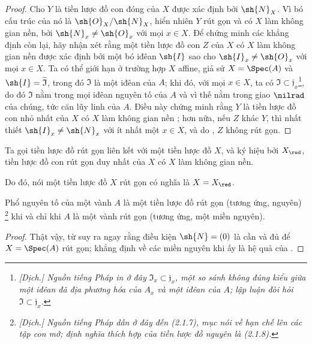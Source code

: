 \documentclass[oneside]{amsart}
\let\EGAOriginalLabel\label
\renewcommand{\label}[1]{\phantomsection\EGAOriginalLabel{#1}}
\begin{document}
\begin{proof}
Cho $Y$ là tiền lược đồ con đóng của $X$ được xác định bởi $\sh{N}_X$.
Vì bó cấu trúc của nó là $\sh{O}_X/\sh{N}_X$, hiển nhiên $Y$ rút gọn và có $X$ làm không gian nền, bởi $\sh{N}_x\neq\sh{O}_x$ với mọi $x\in X$.
Để chứng minh các khẳng định còn lại, hãy nhận xét rằng một tiền lược đồ con $Z$ của $X$ có $X$ làm không gian nền được xác định bởi một bó iđêan $\sh{I}$  sao cho $\sh{I}_x\neq\sh{O}_x$ với mọi $x\in X$.
Ta có thể giới hạn ở trường hợp $X$ affine, giả sử $X=\Spec(A)$ và $\sh{I}=\widetilde{\mathfrak{I}}$, trong đó $\mathfrak{I}$ là một iđêan của $A$;
khi đó, với mọi $x\in X$, ta có $\mathfrak{I}\subset\mathfrak{j}_x$\footnote{\emph{[Dịch.] Nguồn tiếng Pháp in ở đây $\mathfrak{I}_x\subset\mathfrak{j}_x$, một so sánh không đúng kiểu giữa một iđêan đã địa phương hóa của $A_x$ và một iđêan của $A$; lập luận đòi hỏi $\mathfrak{I}\subset\mathfrak{j}_x$.}}, do đó $\mathfrak{I}$ nằm trong mọi iđêan nguyên tố của $A$ và vì thế nằm trong giao $\nilrad$ của chúng, tức căn lũy linh của $A$.
Điều này chứng minh rằng $Y$ là tiền lược đồ con nhỏ nhất của $X$ có $X$ làm không gian nền ;
hơn nữa, nếu $Z$ khác $Y$, thì nhất thiết $\sh{I}_x\neq\sh{N}_x$ với ít nhất một $x\in X$, và do , $Z$ không rút gọn.
\end{proof}

\begin{definition}[5.1.3]
\label{I.5.1.3}
Ta gọi tiền lược đồ rút gọn liên kết với một tiền lược đồ $X$, và ký hiệu bởi $X_\red$, tiền lược đồ con rút gọn duy nhất của $X$ có $X$ làm không gian nền.
\end{definition}

Do đó, nói một tiền lược đồ $X$ rút gọn có nghĩa là $X=X_\red$.

\begin{proposition}[5.1.4]
\label{I.5.1.4}
Phổ nguyên tố của một vành $A$ là một tiền lược đồ rút gọn (tương ứng, nguyên) \footnote{\emph{[Dịch.] Nguồn tiếng Pháp dẫn ở đây đến (2.1.7), mục nói về hạn chế lên các tập con mở; định nghĩa thích hợp của tiền lược đồ nguyên là (2.1.8).}} khi và chỉ khi $A$ là một vành rút gọn (tương ứng, một miền nguyên).
\end{proposition}

\begin{proof}
Thật vậy, từ  suy ra ngay rằng điều kiện $\sh{N}=(0)$ là cần và đủ để $X=\Spec(A)$ rút gọn;
khẳng định về các miền nguyên khi ấy là hệ quả của .
\end{proof}
\end{document}

